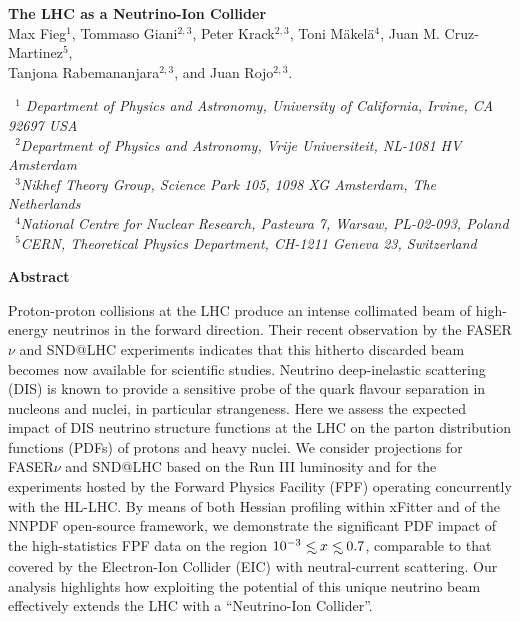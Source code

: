 \documentclass[11pt,a4paper]{article}
\def\lsim{\mathrel{\rlap{\lower4pt\hbox{\hskip1pt$\sim$}}
    \raise1pt\hbox{$<$}}}
\numberwithin{equation}{section}
\numberwithin{figure}{section}
\numberwithin{table}{section}
\begin{document}

\vspace{0.7cm}

\begin{center}
  {\Large \bf The LHC as a Neutrino-Ion Collider }\\
  \vspace{1.1cm}
  {\small
Max Fieg$^{1}$, Tommaso Giani$^{2,3}$, Peter Krack$^{2,3}$, Toni M\"akel\"a$^{4}$, Juan M. Cruz-Martinez$^{5}$, \\[0.1cm]
    Tanjona Rabemananjara$^{2,3}$, and Juan Rojo$^{2,3}$.
  }\\
  
\vspace{0.7cm}

{\it \small
    ~$^1$ Department of Physics and Astronomy, University of California, Irvine, CA 92697 USA  \\[0.1cm]
    ~$^2$Department of Physics and Astronomy, Vrije Universiteit, NL-1081 HV Amsterdam\\[0.1cm]
    ~$^3$Nikhef Theory Group, Science Park 105, 1098 XG Amsterdam, The Netherlands\\[0.1cm]
    ~$^4$National Centre for Nuclear Research, Pasteura 7, Warsaw, PL-02-093, Poland \\[0.1cm]
    ~$^5$CERN, Theoretical Physics Department, CH-1211 Geneva 23, Switzerland \\[0.1cm]
 }


\vspace{1.0cm}

{\bf \large Abstract}

\end{center}

Proton-proton collisions at the LHC produce an intense collimated beam of high-energy neutrinos
in the forward direction.
%
Their recent  observation by the FASER$\nu$ and SND@LHC experiments
indicates that this hitherto discarded beam becomes now available for scientific studies.
%
Neutrino deep-inelastic scattering (DIS) is known
to provide a sensitive probe of the quark flavour separation in nucleons
and nuclei, in particular strangeness.
%
Here we assess the expected impact of DIS neutrino structure functions at the LHC
on the parton distribution functions (PDFs) of protons and heavy nuclei.
%
We consider projections for  FASER$\nu$ and SND@LHC based on the Run III luminosity
and for the  experiments hosted by the
 Forward Physics Facility (FPF) operating concurrently with the HL-LHC.
 By means of both Hessian profiling within {\sc\small xFitter} and
 of the  NNPDF open-source framework,
 we demonstrate the significant PDF impact of the high-statistics FPF data
 on the region $10^{-3}\lsim x \lsim 0.7$, comparable to that covered by the
 Electron-Ion Collider (EIC) with neutral-current scattering.
%
 Our analysis highlights how exploiting the potential
 of this unique neutrino beam  effectively
extends the LHC with a ``Neutrino-Ion Collider''.
\end{document}
